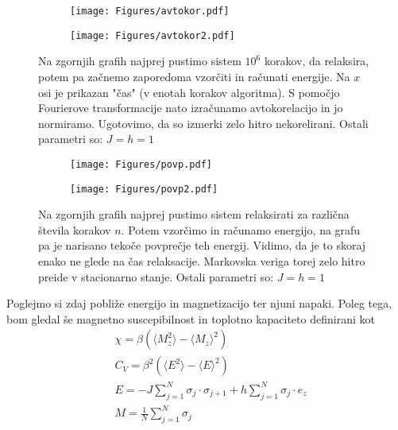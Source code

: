 \documentclass{article}
\begin{document}
\begin{figure}[H]
\centering
\begin{subfigure}{.49\textwidth}
\texttt{[image: Figures/avtokor.pdf]}
\end{subfigure}
\begin{subfigure}{.49\textwidth}
\texttt{[image: Figures/avtokor2.pdf]}
\end{subfigure}
\caption*{Na zgornjih grafih najprej pustimo sistem $10^6$ korakov, da relaksira, potem pa začnemo zaporedoma vzorčiti in računati energije. Na $x$ osi je prikazan "čas" (v enotah korakov algoritma). S pomočjo Fourierove transformacije nato izračunamo avtokorelacijo in jo normiramo. Ugotovimo, da so izmerki zelo hitro nekorelirani. Ostali parametri so: $J=h=1$}
\end{figure}

\begin{figure}[H]
\centering
\begin{subfigure}{.49\textwidth}
\texttt{[image: Figures/povp.pdf]}
\end{subfigure}
\begin{subfigure}{.49\textwidth}
\texttt{[image: Figures/povp2.pdf]}
\end{subfigure}
\caption*{Na zgornjih grafih najprej pustimo sistem relaksirati za različna števila korakov $n$. Potem vzorčimo in računamo energijo, na grafu pa je narisano tekoče povprečje teh energij. Vidimo, da je to skoraj enako ne glede na čas relaksacije. Markovska veriga torej zelo hitro preide v stacionarno stanje. Ostali parametri so: $J=h=1$}
\end{figure}

Poglejmo si zdaj pobliže energijo in magnetizacijo ter njuni napaki. Poleg tega, bom gledal še magnetno suscepibilnost in toplotno kapaciteto definirani kot
\begin{align*}
&\chi = \beta ( \langle M_z^2 \rangle - \langle M_z \rangle ^2) \\
&C_V = \beta^2 (\langle E^2 \rangle - \langle E \rangle ^2) \\
&E = -J \sum_{j=1}^N \sigma_j \cdot \sigma_{j+1} + h \sum_{j=1}^N \sigma_j \cdot e_z \\
&M = \frac{1}{N} \sum_{j=1}^N \sigma_j 
\end{align*}
\end{document}
